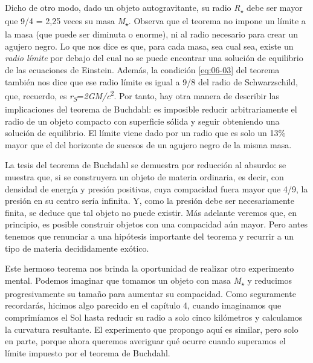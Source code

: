 Dicho de otro modo, dado un objeto autogravitante, su radio \emph{R}\textsubscript{\(\star\)} debe ser mayor que 9/4 = 2,25 veces su masa \emph{M}\textsubscript{\(\star\)}. Observa que el teorema no impone un límite a la masa (que puede ser diminuta o enorme), ni al radio necesario para crear un agujero negro. Lo que nos dice es que, para cada masa, sea cual sea, existe un \emph{radio límite} por debajo del cual no se puede encontrar una solución de equilibrio de las ecuaciones de Einstein. Además, la condición \eqref{eq:06-03} del teorema también nos dice que ese radio límite es igual a 9/8 del radio de Schwarzschild, que, recuerdo, es \emph{r\textsubscript{S}}=\emph{2GM/c}\textsuperscript{2}. Por tanto, hay otra manera de describir las implicaciones del teorema de Buchdahl: es imposible reducir arbitrariamente el radio de un objeto compacto con superficie sólida y seguir obteniendo una solución de equilibrio. El límite viene dado por un radio que es solo un 13\% mayor que el del horizonte de sucesos de un agujero negro de la misma masa.

La tesis del teorema de Buchdahl se demuestra por reducción al absurdo: se muestra que, si se construyera un objeto de materia ordinaria, es decir, con densidad de energía y presión positivas, cuya compacidad fuera mayor que 4/9, la presión en su centro sería infinita. Y, como la presión debe ser necesariamente finita, se deduce que tal objeto no puede existir. Más adelante veremos que, en principio, es posible construir objetos con una compacidad aún mayor. Pero antes tenemos que renunciar a una hipótesis importante del teorema y recurrir a un tipo de materia decididamente exótico.

Este hermoso teorema nos brinda la oportunidad de realizar otro experimento mental. Podemos imaginar que tomamos un objeto con masa \emph{M}\textsubscript{\(\star\)} y reducimos progresivamente su tamaño para aumentar su compacidad. Como seguramente recordarás, hicimos algo parecido en el capítulo 4, cuando imaginamos que comprimíamos el Sol hasta reducir su radio a solo cinco kilómetros y calculamos la curvatura resultante. El experimento que propongo aquí es similar, pero solo en parte, porque ahora queremos averiguar qué ocurre cuando superamos el límite impuesto por el teorema de Buchdahl.

